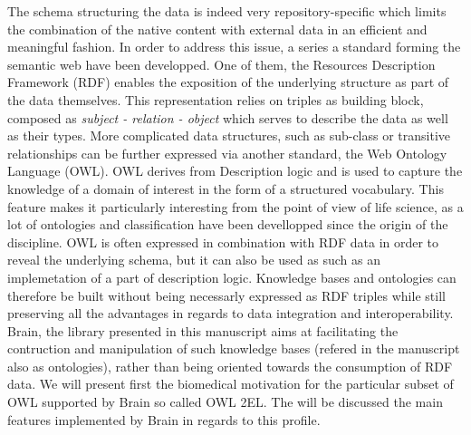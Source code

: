 \documentclass{bioinfo}
\begin{document}
The schema structuring the data is indeed very repository-specific which limits the combination of the native content with external data in an
efficient and meaningful fashion. In order to address this issue, a series a standard forming the semantic web have been developped. One of them,
the Resources Description Framework (RDF) enables the exposition of the underlying structure as part of the data themselves. This
representation relies on triples as building block, composed as \emph{subject - relation - object} which serves to
describe the data as well as their types. More complicated data structures, such as sub-class or
transitive relationships can be further expressed via another standard, the Web Ontology Language (OWL). OWL derives from Description logic and
is used to capture the knowledge of a domain of interest in the form of a structured vocabulary. This feature makes it particularly 
interesting from the point of view of life science, as a lot of ontologies and classification have been devellopped since the origin of 
the discipline. OWL is often expressed in combination with RDF data in order to reveal the underlying schema, but 
it can also be used as such as an implemetation of a part of description logic. 
Knowledge bases and ontologies can therefore be built without being necessarly expressed as RDF triples while still preserving all the 
advantages in regards to data integration and interoperability.
Brain, the library presented in this manuscript aims at facilitating the contruction and manipulation of 
such knowledge bases (refered in the manuscript also as ontologies), rather than being oriented towards the consumption of RDF data. 
We will present first the biomedical motivation for the particular subset of OWL supported by Brain so called OWL 2EL. 
The will be discussed the main features implemented by Brain in regards to this profile.
\end{document}
